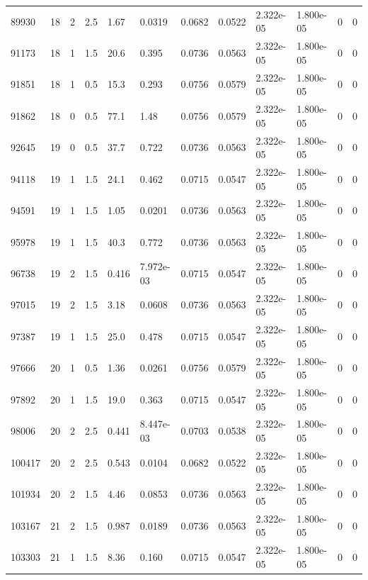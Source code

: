 \documentclass[preview]{standalone}
\begin{document}
{{{\begin{tabular}{L{1.2cm}C{1.2cm} C{0.3cm}C{0.5cm} C{1.4cm}C{1.4cm} C{1.4cm}C{1.4cm} C{1.6cm}C{1.6cm} C{1.6cm}C{1.6cm}}
  89930  &    18  & 2     & 2.5 &  1.67  & 0.0319  &  0.0682&   0.0522& 2.322e-05 & 1.800e-05   &  0 & 0  \\ 
  91173  &    18  & 1     & 1.5 &  20.6  & 0.395  &  0.0736&   0.0563& 2.322e-05 & 1.800e-05   &  0 & 0  \\ 
  91851  &    18  & 1     & 0.5 &  15.3  & 0.293  &  0.0756&   0.0579& 2.322e-05 & 1.800e-05   &  0 & 0  \\ 
  91862  &    18  & 0     & 0.5 &  77.1  & 1.48  &  0.0756&   0.0579& 2.322e-05 & 1.800e-05   &  0 & 0  \\ 
  92645  &    19  & 0     & 0.5 &  37.7  & 0.722  &  0.0736&   0.0563& 2.322e-05 & 1.800e-05   &  0 & 0  \\ 
  94118  &    19  & 1     & 1.5 &  24.1  & 0.462  &  0.0715&   0.0547& 2.322e-05 & 1.800e-05   &  0 & 0  \\ 
  94591  &    19  & 1     & 1.5 &  1.05  & 0.0201  &  0.0736&   0.0563& 2.322e-05 & 1.800e-05   &  0 & 0  \\ 
  95978  &    19  & 1     & 1.5 &  40.3  & 0.772  &  0.0736&   0.0563& 2.322e-05 & 1.800e-05   &  0 & 0  \\ 
  96738  &    19  & 2     & 1.5 &  0.416  & 7.972e-03  &  0.0715&   0.0547& 2.322e-05 & 1.800e-05   &  0 & 0  \\ 
  97015  &    19  & 2     & 1.5 &  3.18  & 0.0608  &  0.0736&   0.0563& 2.322e-05 & 1.800e-05   &  0 & 0  \\ 
  97387  &    19  & 1     & 1.5 &  25.0  & 0.478  &  0.0715&   0.0547& 2.322e-05 & 1.800e-05   &  0 & 0  \\ 
  97666  &    20  & 1     & 0.5 &  1.36  & 0.0261  &  0.0756&   0.0579& 2.322e-05 & 1.800e-05   &  0 & 0  \\ 
  97892  &    20  & 1     & 1.5 &  19.0  & 0.363  &  0.0715&   0.0547& 2.322e-05 & 1.800e-05   &  0 & 0  \\ 
  98006  &    20  & 2     & 2.5 &  0.441  & 8.447e-03  &  0.0703&   0.0538& 2.322e-05 & 1.800e-05   &  0 & 0  \\ 
  100417  &    20  & 2     & 2.5 &  0.543  & 0.0104  &  0.0682&   0.0522& 2.322e-05 & 1.800e-05   &  0 & 0  \\ 
  101934  &    20  & 2     & 1.5 &  4.46  & 0.0853  &  0.0736&   0.0563& 2.322e-05 & 1.800e-05   &  0 & 0  \\ 
  103167  &    21  & 2     & 1.5 &  0.987  & 0.0189  &  0.0736&   0.0563& 2.322e-05 & 1.800e-05   &  0 & 0  \\ 
  103303  &    21  & 1     & 1.5 &  8.36  & 0.160  &  0.0715&   0.0547& 2.322e-05 & 1.800e-05   &  0 & 0  \\ 

\end{tabular}}}}
\end{document}
